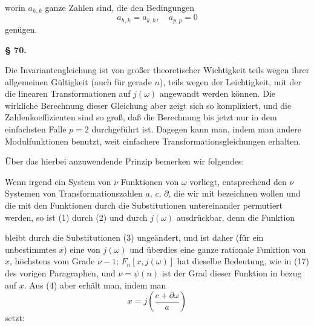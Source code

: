 worin $a_{h,k}$ ganze Zahlen sind, die den Bedingungen
\[
a_{h,k} = a_{k,h}, \quad a_{p,p} = 0
\]
genügen.

\begin{center}
\textbf{§ 70.\quad {}}
\end{center}

Die Invariantengleichung ist von großer theoretischer Wichtigkeit teils
wegen ihrer allgemeinen Gültigkeit (auch für gerade $n$), teils wegen der
Leichtigkeit, mit der die linearen Transformationen auf $j(\omega)$
angewandt werden können. Die wirkliche Berechnung dieser Gleichung
aber zeigt sich so kompliziert, und die Zahlenkoeffizienten sind so
groß, daß die Berechnung bis jetzt nur in dem einfachsten Falle $p=2$
durchgeführt ist. Dagegen kann man, indem man andere Modulfunktionen
benutzt, weit einfachere Transformationsgleichungen erhalten.

Über das hierbei anzuwendende Prinzip bemerken wir folgendes:

Wenn irgend ein System von $\nu$ Funktionen von $\omega$ vorliegt,
entsprechend den $\nu$ Systemen von Transformationszahlen $a$, $c$,
$\partial$, die wir mit
bezeichnen wollen und die  mit den Funktionen
durch die Substitutionen
untereinander permutiert werden, so ist (1)  durch (2) und
durch $j(\omega)$ ausdrückbar, denn die Funktion


bleibt durch die Substitutionen (3) ungeändert, und ist daher (für ein
unbestimmtes $x$) eine  von $j(\omega)$ und überdies
eine ganze rationale Funktion von $x$, höchstens vom Grade $\nu-1$;
$F_n[x,j(\omega)]$ hat dieselbe Bedeutung, wie in (17) des vorigen
Paragraphen, und $\nu=\psi(n)$ ist der Grad dieser Funktion in bezug
auf $x$. Aus (4) aber erhält man, indem man
\[
x = j\left(\frac{c+\partial\omega}{a}\right)
\]
setzt:

